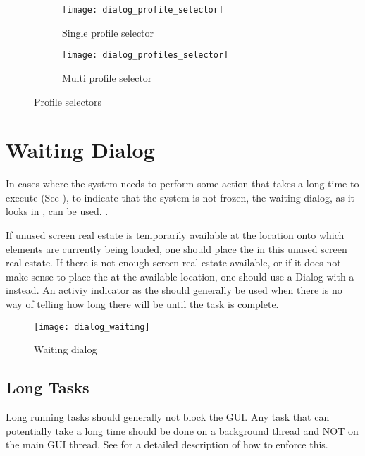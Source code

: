 \begin{figure}[!htbp]
    \centering
    \begin{subfigure}[t]{0.4\textwidth}
    	\centering
        \texttt{[image: dialog\_profile\_selector]}
        \caption{Single profile selector}
        \label{fig:profile_selector_dialog}
    \end{subfigure}
    \hspace{5em}
    \begin{subfigure}[t]{0.4\textwidth}
    	\centering
        \texttt{[image: dialog\_profiles\_selector]}
        \caption{Multi profile selector}
        \label{fig:profiles_selector_dialog}
    \end{subfigure}
    
    \caption{Profile selectors}
    \label{fig:profile_selection}
\end{figure}

\section{Waiting Dialog}
\label{sec:waiting_dialog}

In cases where the system needs to perform some action that takes a long time to execute (See ), to indicate that the system is not frozen, the waiting dialog, as it looks in , can be used. .

\begin{note}
    If unused screen real estate is temporarily available at the location onto which elements are currently being loaded, one should place the  in this unused screen real estate. If there is not enough screen real estate available, or if it does not make sense to place the  at the available location, one should use a Dialog with a  instead. An activiy indicator as the  should generally be used when there is no way of telling how long there will be until the task is complete. 
\end{note}


\begin{figure}[h]
	\centering
	\texttt{[image: dialog\_waiting]}
	\caption{Waiting dialog}
	\label{fig:dialog_waiting}
\end{figure}
\FloatBarrier

\subsection{Long Tasks}
\label{sub:long_tasks}
Long running tasks should generally not block the GUI. Any task that can potentially take a long time should be done on a background thread and NOT on the main GUI thread. See  for a detailed description of how to enforce this. 

